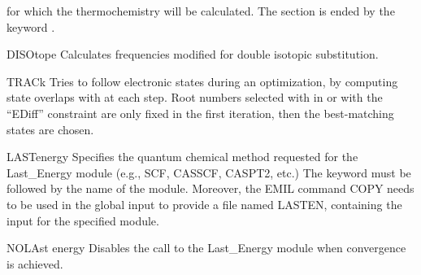 \begin{keywordlist}
for which the thermochemistry will be calculated.
The section is ended by the keyword .
\item[DISOtope]
Calculates frequencies modified for double isotopic substitution.
\item[TRACk]
Tries to follow electronic states during an optimization, by computing state overlaps with 
at each step. Root numbers selected with  in  or with the ``EDiff'' constraint
are only fixed in the first iteration, then the best-matching states are chosen.
\item[LASTenergy]
Specifies the quantum chemical method requested for the Last\_Energy module (e.g., SCF, CASSCF, CASPT2, etc.)
The keyword must be followed by the name of the module. Moreover, the EMIL command COPY needs to be used
in the global input to provide a file named LASTEN, containing the input for the specified module.
\item[NOLAst energy]
Disables the call to the Last\_Energy module when convergence is achieved.
\end{keywordlist}


